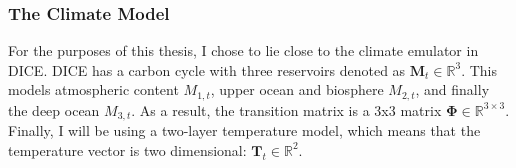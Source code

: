\subsubsection{The Climate Model}
For the purposes of this thesis, I chose to lie close to the climate emulator in DICE. DICE has a carbon cycle with three reservoirs denoted as \( \mathbf{M}_t \in \mathbb{R}^3 \). This models atmospheric content \( M_{1,t} \), upper ocean and biosphere \( M_{2,t} \), and finally the deep ocean \( M_{3,t} \). As a result, the transition matrix is a 3x3 matrix \(\bm{\Phi} \in \mathbb{R}^{3\times 3}\). Finally, I will be using a two-layer temperature model, which means that the temperature vector is two dimensional: \(\bm{T}_t \in \mathbb{R}^2\).